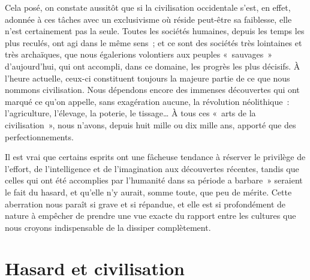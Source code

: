 \documentclass[french,twoside]{book} %
\begin{document}
Cela posé, on constate aussitôt que si la civilisation occidentale s’est, en effet, adonnée à ces tâches avec un exclusivisme où réside peut-être sa faiblesse, elle n’est certainement pas la seule. Toutes les sociétés humaines, depuis les temps les plus reculés, ont agi dans le même sens ; et ce sont des sociétés très lointaines et très archaïques, que nous égalerions volontiers aux peuples « sauvages » d’aujourd’hui, qui ont accompli, dans ce domaine, les progrès les plus décisifs. À l’heure actuelle, ceux-ci constituent toujours la majeure partie de ce que nous nommons civilisation. Nous dépendons encore des immenses découvertes qui ont marqué ce qu’on appelle, sans exagération aucune, la révolution néolithique : l’agriculture, l’élevage, la poterie, le tissage… À tous ces « arts de la civilisation », nous n’avons, depuis huit mille ou dix mille ans, apporté que des perfectionnements.\par
Il est vrai que certains esprits ont une fâcheuse tendance à réserver le privilège de l’effort, de l’intelligence et de l’imagination aux découvertes récentes, tandis que celles qui ont été accomplies par l’humanité dans sa période a barbare » seraient le fait du hasard, et qu’elle n’y aurait, somme toute, que peu de mérite. Cette aberration nous paraît si grave et si répandue, et elle est si profondément de nature à empêcher de prendre une vue exacte du rapport entre les cultures que nous croyons indispensable de la dissiper complètement.

\section[{Hasard et civilisation}]{Hasard et civilisation}
\renewcommand{\leftmark}{Hasard et civilisation}
\end{document}
